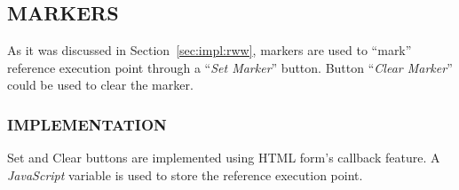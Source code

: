 \subsection{MARKERS}
As it was discussed in Section~\ref{sec:impl:rww}, markers are used to ``mark'' reference execution point through a ``{\it Set Marker}'' button. Button ``{\it Clear Marker}'' could  be used to clear the marker.

\subsubsection{IMPLEMENTATION}

Set and Clear buttons are implemented using HTML form's callback feature. A {\it JavaScript} variable is used to store the reference execution point.


